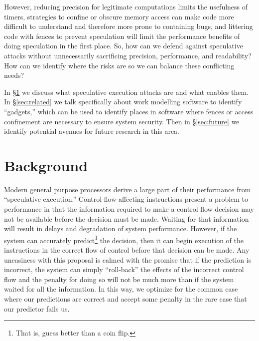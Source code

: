 \documentclass[11pt,conference]{IEEEtran}
\begin{document}
However, reducing precision for legitimate computations limits the usefulness of timers, strategies to confine or obscure memory access can make code more difficult to understand and therefore more prone to containing bugs, and littering code with fences to prevent speculation will limit the performance benefits of doing speculation in the first place.
So, how can we defend against speculative attacks without unnecessarily sacrificing precision, performance, and readability?
How can we identify where the risks are so we can balance these conflicting needs?

In \S\ref{sec:background} we discuss what speculative execution attacks are and what enables them.
In \S\ref{sec:related} we talk specifically about work modelling software to identify ``gadgets,'' which can be used to identify places in software where fences or access confinement are necessary to ensure system security.
Then in \S\ref{sec:future} we identify potential avenues for future research in this area.

\section{Background}\label{sec:background}

Modern general purpose processors derive a large part of their performance from ``speculative execution.''
Control-flow-affecting instructions present a problem to performance in that the information required to make a control flow decision may not be available before the decision must be made.
Waiting for that information will result in delays and degradation of system performance.
However, if the system can accurately predict\footnote{That is, guess better than a coin flip.} the decision, then it can begin execution of the instructions in the correct flow of control before that decision can be made.
Any uneasiness with this proposal is calmed with the promise that if the prediction is incorrect, the system can simply ``roll-back'' the effects of the incorrect control flow and the penalty for doing so will not be much more than if the system waited for all the information.
In this way, we optimize for the common case where our predictions are correct and accept some penalty in the rare case that our predictor fails us.
\end{document}
